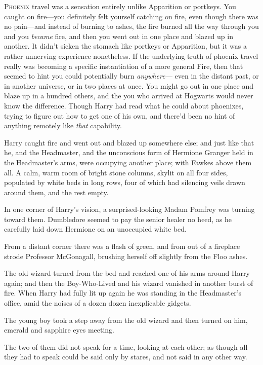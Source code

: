 
\lettrine{P}{hoenix} travel
was a sensation entirely unlike Apparition or portkeys. You caught on
fire—you definitely felt yourself catching on fire, even though there was no
pain—and instead of burning to ashes, the fire burned all the way through you
and you \emph{became} fire, and then you went out in one place and blazed up in
another. It didn't sicken the stomach like portkeys or Apparition, but it was a
rather unnerving experience nonetheless. If the underlying truth of phoenix
travel really was becoming a specific instantiation of a more general Fire,
then that seemed to hint you could potentially burn \emph{anywhere—} even in
the distant past, or in another universe, or in two places at once. You might
go out in one place and blaze up in a hundred others, and the you who arrived
at Hogwarts would never know the difference. Though Harry had read what he
could about phoenixes, trying to figure out how to get one of his own, and
there'd been no hint of anything remotely like \emph{that} capability.

Harry caught fire and went out and blazed up somewhere else; and just like that
he, and the Headmaster, and the unconscious form of Hermione Granger held in
the Headmaster's arms, were occupying another place; with Fawkes above them
all. A calm, warm room of bright stone columns, skylit on all four sides,
populated by white beds in long rows, four of which had silencing veils drawn
around them, and the rest empty.

In one corner of Harry's vision, a surprised-looking Madam Pomfrey was turning
toward them. Dumbledore seemed to pay the senior healer no heed, as he
carefully laid down Hermione on an unoccupied white bed.

From a distant corner there was a flash of green, and from out of a fireplace
strode Professor McGonagall, brushing herself off slightly from the Floo ashes.

The old wizard turned from the bed and reached one of his arms around Harry
again; and then the Boy-Who-Lived and his wizard vanished in another burst of
fire.
\sbreak
When Harry had fully lit up again he was standing in the Headmaster's office,
amid the noises of a dozen dozen inexplicable gidgets.

The young boy took a step away from the old wizard and then turned on him,
emerald and sapphire eyes meeting.

The two of them did not speak for a time, looking at each other; as though all
they had to speak could be said only by stares, and not said in any other way.

